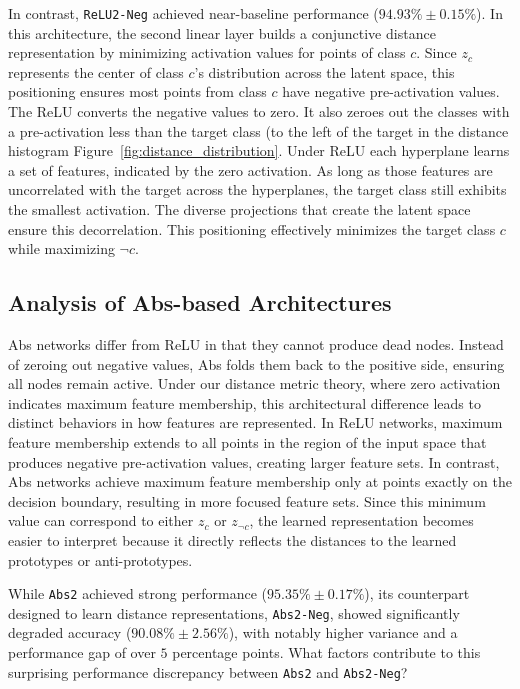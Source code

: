 In contrast, \texttt{ReLU2-Neg} achieved near-baseline performance ($94.93\% \pm 0.15\%$). In this architecture, the second linear layer builds a conjunctive distance representation by minimizing activation values for points of class $c$. Since $z_c$ represents the center of class $c$'s distribution across the latent space, this positioning ensures most points from class $c$ have negative pre-activation values. The ReLU converts the negative values to zero. It also zeroes out the classes with a pre-activation less than the target class (to the left of the target in the distance histogram Figure~\ref{fig:distance_distribution}. Under ReLU each hyperplane learns a set of features, indicated by the zero activation. As long as those features are uncorrelated with the target across the hyperplanes, the target class still exhibits the smallest activation. The diverse projections that create the latent space ensure this decorrelation. This positioning effectively minimizes the target class $c$ while maximizing $\neg c$.

\subsection{Analysis of Abs-based Architectures}

Abs networks differ from ReLU in that they cannot produce dead nodes. Instead of zeroing out negative values, Abs folds them back to the positive side, ensuring all nodes remain active. Under our distance metric theory, where zero activation indicates maximum feature membership, this architectural difference leads to distinct behaviors in how features are represented. In ReLU networks, maximum feature membership extends to all points in the region of the input space that produces negative pre-activation values, creating larger feature sets. In contrast, Abs networks achieve maximum feature membership only at points exactly on the decision boundary, resulting in more focused feature sets. Since this minimum value can correspond to either $z_c$ or $z_{\neg c}$, the learned representation becomes easier to interpret because it directly reflects the distances to the learned prototypes or anti-prototypes.

While \texttt{Abs2} achieved strong performance ($95.35\% \pm 0.17\%$), its counterpart designed to learn distance representations, \texttt{Abs2-Neg}, showed significantly degraded accuracy ($90.08\% \pm 2.56\%$), with notably higher variance and a performance gap of over $5$ percentage points. What factors contribute to this surprising performance discrepancy between \texttt{Abs2} and \texttt{Abs2-Neg}?

